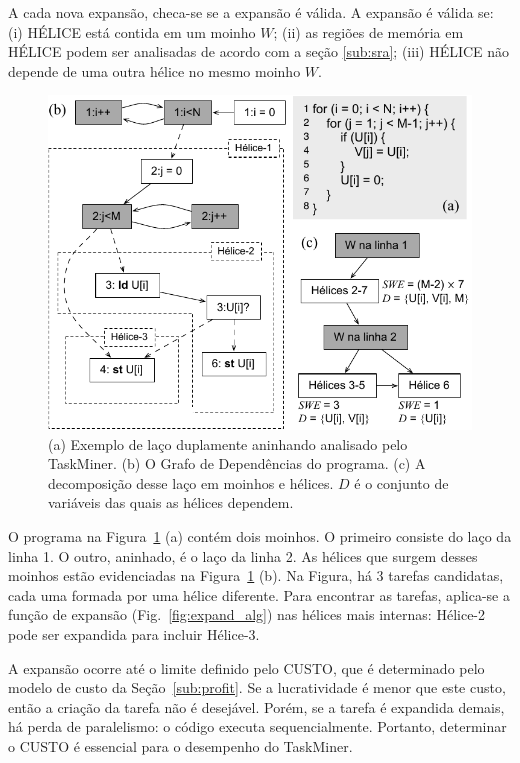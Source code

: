 \documentclass[sigplan,10pt,review]{acmart}
\newcommand\Taskminer{\mbox{\textsf{TaskMiner}}}
\begin{document}
A cada nova expansão, checa-se se a expansão é válida. A expansão é válida se:
(i) \textsf{HÉLICE} está contida em um moinho $W$;
(ii) as regiões de memória em \textsf{HÉLICE} podem ser analisadas de acordo com
a seção \ref{sub:sra};
(iii) \textsf{HÉLICE} não depende de uma outra hélice no mesmo moinho $W$.

\begin{figure}[h]
\begin{center}
\includegraphics[width=1\columnwidth]{images/ex_expansion}
\caption{(a) Exemplo de laço duplamente aninhando analisado pelo {\Taskminer}.
(b) O Grafo de Dependências do programa.
(c) A decomposição desse laço em moinhos e hélices. $D$ é o conjunto de variáveis
das quais as hélices dependem.}
\label{fig:ex_expansion}
\end{center}
\end{figure}

O programa na Figura~\ref{fig:ex_expansion} (a) contém dois moinhos.
O primeiro consiste do laço da linha 1. O outro, aninhado, é o laço da linha 2.
As hélices que surgem desses moinhos estão evidenciadas na Figura~\ref{fig:ex_expansion} (b).
Na Figura, há 3 tarefas candidatas, cada uma formada por uma hélice diferente.
Para encontrar as tarefas, aplica-se a função de expansão (Fig.~\ref{fig:expand_alg})
nas hélices mais internas: \textsf{Hélice-2} pode ser expandida para incluir \textsf{Hélice-3}.

A expansão ocorre até o limite definido pelo \textsf{CUSTO}, que é determinado pelo modelo de custo
da Seção~\ref{sub:profit}. Se a lucratividade é menor que este custo, então
a criação da tarefa não é desejável. Porém, se a tarefa é expandida demais, 
há perda de paralelismo: o código executa sequencialmente. Portanto, determinar o \textsf{CUSTO}
é essencial para o desempenho do {\Taskminer}.
\end{document}
